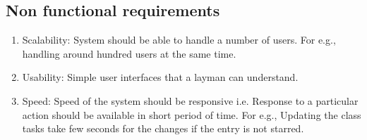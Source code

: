 \begin{itemize}
\subsection{Non functional requirements}
\begin{enumerate} 
\item Scalability: System should be able to handle a number of users. 
For e.g., handling around hundred users at the same time.
\item Usability: Simple user interfaces that a layman can understand.
\item Speed: Speed of the system should be responsive i.e. Response to
 a particular action should be available in short period of time. For 
e.g., Updating the class tasks take few seconds for the changes if 
the entry is not starred.
\end{enumerate}
\end{itemize}


